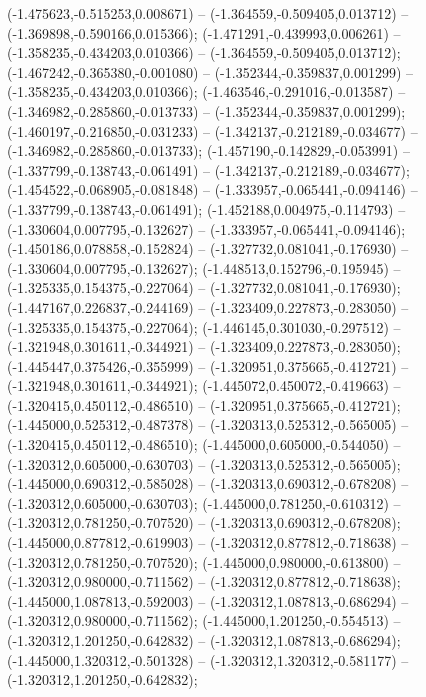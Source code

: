  (-1.475623,-0.515253,0.008671) -- (-1.364559,-0.509405,0.013712) -- (-1.369898,-0.590166,0.015366);
 (-1.471291,-0.439993,0.006261) -- (-1.358235,-0.434203,0.010366) -- (-1.364559,-0.509405,0.013712);
 (-1.467242,-0.365380,-0.001080) -- (-1.352344,-0.359837,0.001299) -- (-1.358235,-0.434203,0.010366);
 (-1.463546,-0.291016,-0.013587) -- (-1.346982,-0.285860,-0.013733) -- (-1.352344,-0.359837,0.001299);
 (-1.460197,-0.216850,-0.031233) -- (-1.342137,-0.212189,-0.034677) -- (-1.346982,-0.285860,-0.013733);
 (-1.457190,-0.142829,-0.053991) -- (-1.337799,-0.138743,-0.061491) -- (-1.342137,-0.212189,-0.034677);
 (-1.454522,-0.068905,-0.081848) -- (-1.333957,-0.065441,-0.094146) -- (-1.337799,-0.138743,-0.061491);
 (-1.452188,0.004975,-0.114793) -- (-1.330604,0.007795,-0.132627) -- (-1.333957,-0.065441,-0.094146);
 (-1.450186,0.078858,-0.152824) -- (-1.327732,0.081041,-0.176930) -- (-1.330604,0.007795,-0.132627);
 (-1.448513,0.152796,-0.195945) -- (-1.325335,0.154375,-0.227064) -- (-1.327732,0.081041,-0.176930);
 (-1.447167,0.226837,-0.244169) -- (-1.323409,0.227873,-0.283050) -- (-1.325335,0.154375,-0.227064);
 (-1.446145,0.301030,-0.297512) -- (-1.321948,0.301611,-0.344921) -- (-1.323409,0.227873,-0.283050);
 (-1.445447,0.375426,-0.355999) -- (-1.320951,0.375665,-0.412721) -- (-1.321948,0.301611,-0.344921);
 (-1.445072,0.450072,-0.419663) -- (-1.320415,0.450112,-0.486510) -- (-1.320951,0.375665,-0.412721);
 (-1.445000,0.525312,-0.487378) -- (-1.320313,0.525312,-0.565005) -- (-1.320415,0.450112,-0.486510);
 (-1.445000,0.605000,-0.544050) -- (-1.320312,0.605000,-0.630703) -- (-1.320313,0.525312,-0.565005);
 (-1.445000,0.690312,-0.585028) -- (-1.320313,0.690312,-0.678208) -- (-1.320312,0.605000,-0.630703);
 (-1.445000,0.781250,-0.610312) -- (-1.320312,0.781250,-0.707520) -- (-1.320313,0.690312,-0.678208);
 (-1.445000,0.877812,-0.619903) -- (-1.320312,0.877812,-0.718638) -- (-1.320312,0.781250,-0.707520);
 (-1.445000,0.980000,-0.613800) -- (-1.320312,0.980000,-0.711562) -- (-1.320312,0.877812,-0.718638);
 (-1.445000,1.087813,-0.592003) -- (-1.320312,1.087813,-0.686294) -- (-1.320312,0.980000,-0.711562);
 (-1.445000,1.201250,-0.554513) -- (-1.320312,1.201250,-0.642832) -- (-1.320312,1.087813,-0.686294);
 (-1.445000,1.320312,-0.501328) -- (-1.320312,1.320312,-0.581177) -- (-1.320312,1.201250,-0.642832);

